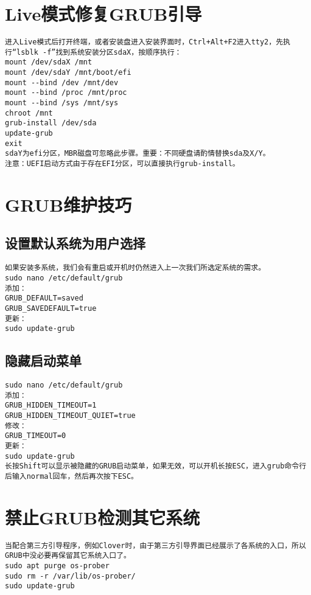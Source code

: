 \documentclass[a4paper,fontset=fandol,zihao=-4,linespread=1.2,oneside]{ctexbook}
\begin{document}
\section{Live模式修复GRUB引导}
\begin{lstlisting}
进入Live模式后打开终端，或者安装盘进入安装界面时，Ctrl+Alt+F2进入tty2，先执行“lsblk -f”找到系统安装分区sdaX，按顺序执行：
mount /dev/sdaX /mnt
mount /dev/sdaY /mnt/boot/efi
mount --bind /dev /mnt/dev
mount --bind /proc /mnt/proc
mount --bind /sys /mnt/sys
chroot /mnt
grub-install /dev/sda
update-grub
exit
sdaY为efi分区，MBR磁盘可忽略此步骤。重要：不同硬盘请酌情替换sda及X/Y。
注意：UEFI启动方式由于存在EFI分区，可以直接执行grub-install。
\end{lstlisting}

\section{GRUB维护技巧}

\subsection{设置默认系统为用户选择}
\begin{lstlisting}
如果安装多系统，我们会有重启或开机时仍然进入上一次我们所选定系统的需求。
sudo nano /etc/default/grub
添加：
GRUB_DEFAULT=saved
GRUB_SAVEDEFAULT=true
更新：
sudo update-grub
\end{lstlisting}

\subsection{隐藏启动菜单}
\begin{lstlisting}
sudo nano /etc/default/grub
添加：
GRUB_HIDDEN_TIMEOUT=1
GRUB_HIDDEN_TIMEOUT_QUIET=true
修改：
GRUB_TIMEOUT=0
更新：
sudo update-grub
长按Shift可以显示被隐藏的GRUB启动菜单，如果无效，可以开机长按ESC，进入grub命令行后输入normal回车，然后再次按下ESC。
\end{lstlisting}

\section{禁止GRUB检测其它系统}
\begin{lstlisting}
当配合第三方引导程序，例如Clover时，由于第三方引导界面已经展示了各系统的入口，所以GRUB中没必要再保留其它系统入口了。
sudo apt purge os-prober
sudo rm -r /var/lib/os-prober/
sudo update-grub
\end{lstlisting}
\end{document}
